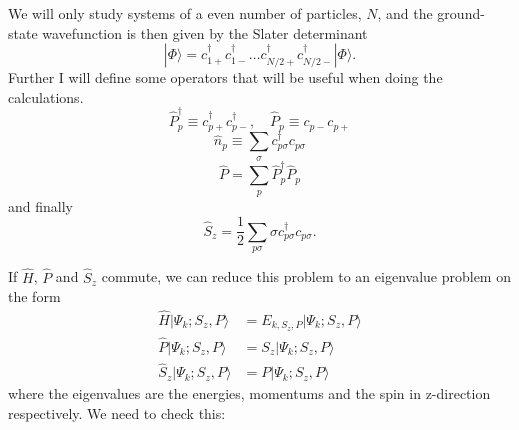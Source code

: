 \documentclass[norsk,a4paper,12pt]{article}
\begin{document}
We will only study systems of a even number of particles, $N$, and the ground-state wavefunction is then given by the Slater determinant
\begin{equation}
|\Phi\rangle=c_{1+}^{\dagger}c_{1-}^{\dagger}\hdots c_{N/2 +}^{\dagger}c_{N/2 -}^{\dagger}|\Phi\rangle.
\end{equation}
Further I will define some operators that will be useful when doing the calculations. 
\begin{equation}
\hat{P}_p^{\dagger}\equiv c_{p+}^{\dagger}c_{p-}^{\dagger},\quad \hat{P}_p\equiv c_{p-}c_{p+}
\end{equation}
\begin{equation}
\hat{n}_p\equiv\sum_{\sigma}c_{p\sigma}^{\dagger}c_{p\sigma}
\end{equation}
\begin{equation}
\hat{P}=\sum_p\hat{P}_p^{\dagger}\hat{P}_p
\end{equation}
and finally
\begin{equation}
\hat{S}_z=\frac{1}{2}\sum_{p\sigma}\sigma c_{p\sigma}^{\dagger}c_{p\sigma}.
\end{equation}

If $\hat{H}$, $\hat{P}$ and $\hat{S}_z$ commute, we can reduce this problem to an eigenvalue problem on the form
\begin{align*}
\hat{H}|\Psi_k;S_z,P\rangle&=E_{k,S_z,P}|\Psi_k;S_z,P\rangle\\
\hat{P}|\Psi_k;S_z,P\rangle&=S_z|\Psi_k;S_z,P\rangle\\
\hat{S}_z|\Psi_k;S_z,P\rangle&=P|\Psi_k;S_z,P\rangle
\end{align*}
where the eigenvalues are the energies, momentums and the spin in z-direction respectively. We need to check this:
\end{document}
